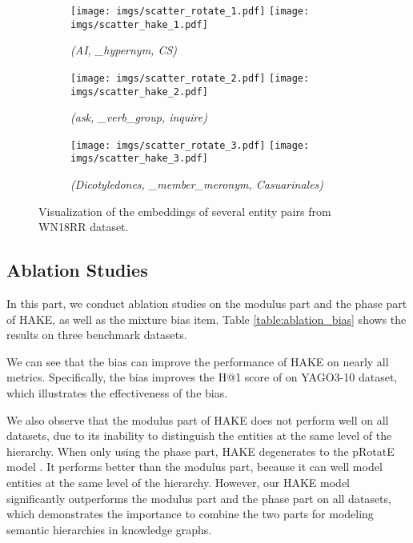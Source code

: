 \documentclass[letterpaper]{article} \usepackage{aaai20}  \usepackage{times}  \usepackage{helvet} \usepackage{courier}  \usepackage[hyphens]{url}  \usepackage{graphicx} \urlstyle{rm} \def\UrlFont{\rm}  \usepackage{graphicx}  \frenchspacing  \setlength{\pdfpagewidth}{8.5in}  \setlength{\pdfpageheight}{11in}
\newcommand{\citep}{\cite}
\begin{document}
\begin{figure}[!ht]
  \centering \begin{subfigure}[b]{0.4\textwidth}
  \centering
  \texttt{[image: imgs/scatter\_rotate\_1.pdf]}\hspace{4mm}
  \texttt{[image: imgs/scatter\_hake\_1.pdf]}
  \caption{\textit{(AI, \_hypernym, CS)}}
  \label{fig:scatter_modulus_sub1}
\end{subfigure} 

\vspace{2mm}
\begin{subfigure}[b]{0.4\textwidth}
  \centering
  \texttt{[image: imgs/scatter\_rotate\_2.pdf]}\hspace{4mm}
  \texttt{[image: imgs/scatter\_hake\_2.pdf]}
  \caption{\textit{(ask, \_verb\_group, inquire)}}
  \label{fig:scatter_modulus_sub2}
\end{subfigure} 

\vspace{2mm}
\begin{subfigure}[b]{0.4\textwidth}
  \centering
  \texttt{[image: imgs/scatter\_rotate\_3.pdf]}\hspace{4mm}
  \texttt{[image: imgs/scatter\_hake\_3.pdf]}
  \caption{\textit{(Dicotyledones, \_member\_meronym, Casuarinales)}}
  \label{fig:scatter_modulus_sub3}
\end{subfigure} 
\caption{Visualization of the embeddings of several entity pairs from WN18RR dataset.
}
\label{fig:scatter_modulus}
\end{figure}

\subsection{Ablation Studies}
In this part, we conduct ablation studies on the modulus part and the phase part of HAKE, as well as the mixture bias item.  Table \ref{table:ablation_bias} shows the results on three benchmark datasets.

We can see that the bias can improve the performance of HAKE on nearly all metrics. Specifically, the bias improves the H@1 score of  on YAGO3-10 dataset, which illustrates the effectiveness of the bias.


We also observe that the modulus part of HAKE does not perform well on all datasets, due to its inability to distinguish the entities at the same level of the hierarchy. When only using the phase part, HAKE degenerates to the pRotatE model \citep{rotate}. It performs better than the modulus part, because it can well model entities at the same level of the hierarchy. However, our HAKE model significantly outperforms the modulus part and the phase part on all datasets, which demonstrates the importance to combine the two parts for modeling semantic hierarchies in knowledge graphs.
\end{document}
